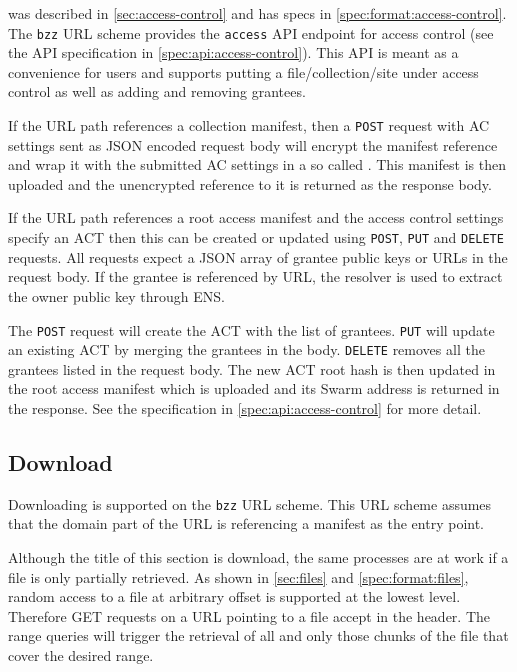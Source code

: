  was described in \ref{sec:access-control} and has specs in \ref{spec:format:access-control}. The \lstinline{bzz} URL scheme provides the \lstinline{access} API endpoint for access control (see the API specification in \ref{spec:api:access-control}). This API is meant as a convenience for users and supports putting a file/collection/site under access control as well as adding and removing grantees.

If the URL path references a collection manifest, then a \lstinline{POST} request with AC settings sent as JSON encoded request body will encrypt the manifest reference and wrap it with the submitted AC settings in a so called . This manifest is then  uploaded and the unencrypted reference to it is returned as the response body. 

If the URL path references a root access manifest and the access control settings specify an ACT then this can be created or updated using \lstinline{POST}, \lstinline{PUT} and \lstinline{DELETE} requests. All requests expect a JSON array of grantee public keys or URLs in the request body. If the grantee is referenced by URL, the resolver is used to extract the owner public key through ENS.

The \lstinline{POST} request will create the ACT with the list of grantees. \lstinline{PUT} will update an existing ACT by merging the grantees in the body. \lstinline{DELETE} removes all the grantees listed in the request body. The new ACT root hash is then updated in the root access manifest which is uploaded and its Swarm address is returned in the response. See the specification in  \ref{spec:api:access-control} for more detail.



\subsection{Download \statusgreen}\label{sec:download}

Downloading is supported on the \lstinline{bzz} URL scheme. This URL scheme assumes that the domain part of the URL is referencing a manifest as the entry point. 

Although the title of this section is download, the same  processes are at work if a file is only partially retrieved. As shown in \ref{sec:files} and \ref{spec:format:files}, random access to a file at arbitrary offset is supported at the lowest level. Therefore GET requests on a URL pointing to a file accept  in the header. The range queries will trigger the retrieval of all and only those chunks of the file that cover the desired range.  

